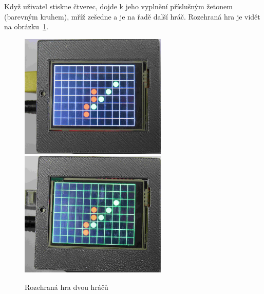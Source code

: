 \begin{enumerate}
Když uživatel stiskne čtverec, dojde k jeho vyplnění příslušným žetonem (barevným kruhem), mříž zešedne a je na řadě další hráč. Rozehraná hra je vidět na obrázku~\ref{fig:faze5}.
\begin{figure}[H]
\centering
\includegraphics[width=7cm, angle=0]{img/gameFlow/phase05a.jpg}
\includegraphics[width=7cm, angle=0]{img/gameFlow/phase05b.jpg}
\caption{\label{fig:faze5} Rozehraná hra dvou hráčů}
\end{figure}


\end{enumerate}
